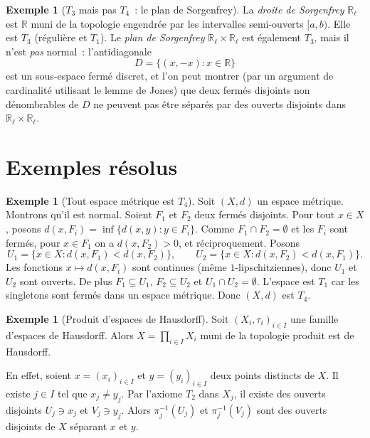 \documentclass[12pt,a4paper,openany]{book}
\theoremstyle{definition}
\theoremstyle{cours}
\theoremstyle{coursnormal}
\newtheorem{exemple}[theoreme]{Exemple}
\newcommand{\R}{\mathbb{R}}
\begin{document}
\begin{exemple}[$T_3$ mais pas $T_4$~: le plan de Sorgenfrey]\label{ex:sorgenfrey}
  La \emph{droite de Sorgenfrey} $\R_\ell$ est $\R$ muni de la topologie engendrée par les
  intervalles semi-ouverts $[a,b)$. Elle est $T_3$ (régulière et $T_1$). Le
  \emph{plan de Sorgenfrey} $\R_\ell\times\R_\ell$ est également $T_3$, mais
  il n'est \emph{pas} normal~: l'antidiagonale
  \[
    D = \{(x,-x) : x\in\R\}
  \]
  est un sous-espace fermé discret, et l'on peut montrer (par un argument de
  cardinalité utilisant le lemme de Jones) que deux fermés disjoints non
  dénombrables de $D$ ne peuvent pas être séparés par des ouverts disjoints
  dans $\R_\ell\times\R_\ell$.
\end{exemple}

\section{Exemples résolus}\label{sec:exemples-separation}

\begin{exemple}[Tout espace métrique est $T_4$]\label{ex:metrique-T4}
  Soit $(X,d)$ un espace métrique. Montrons
  qu'il est normal. Soient $F_1$ et $F_2$ deux fermés disjoints. Pour tout
  $x\in X$, posons $d(x,F_i)=\inf\{d(x,y):y\in F_i\}$. Comme $F_1\cap
  F_2=\emptyset$ et les $F_i$ sont fermés, pour $x\in F_1$ on a
  $d(x,F_2)>0$, et réciproquement. Posons
  \[
    U_1 = \bigl\{x\in X : d(x,F_1)<d(x,F_2)\bigr\},\qquad
    U_2 = \bigl\{x\in X : d(x,F_2)<d(x,F_1)\bigr\}.
  \]
  Les fonctions $x\mapsto d(x,F_i)$ sont continues (même $1$-lipschitziennes),
  donc $U_1$ et $U_2$ sont ouverts. De plus $F_1\subseteq U_1$, $F_2\subseteq
  U_2$ et $U_1\cap U_2=\emptyset$. L'espace est $T_1$ car les singletons sont
  fermés dans un espace métrique. Donc $(X,d)$ est $T_4$.
\end{exemple}

\begin{exemple}[Produit d'espaces de Hausdorff]\label{ex:produit-hausdorff}
  Soit $(X_i,\tau_i)_{i\in I}$ une famille d'espaces de Hausdorff. Alors $X=\prod_{i\in I}X_i$ muni de la topologie
  produit est de Hausdorff.

  En effet, soient $x=(x_i)_{i\in I}$ et $y=(y_i)_{i\in I}$ deux points
  distincts de $X$. Il existe $j\in I$ tel que $x_j\neq y_j$. Par l'axiome
  $T_2$ dans $X_j$, il existe des ouverts disjoints $U_j\ni x_j$ et $V_j\ni
  y_j$. Alors $\pi_j^{-1}(U_j)$ et $\pi_j^{-1}(V_j)$ sont des ouverts
  disjoints de $X$ séparant $x$ et $y$.
\end{exemple}
\end{document}
